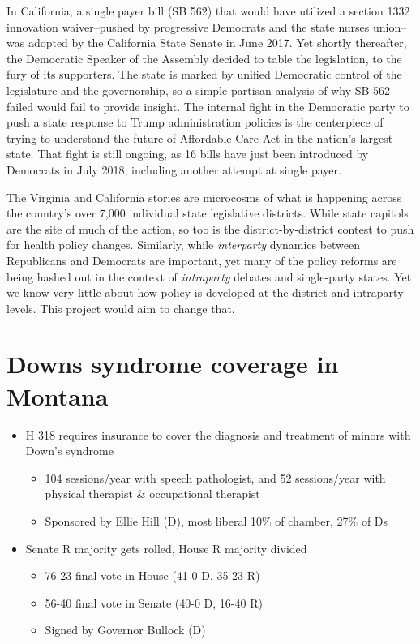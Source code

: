 \documentclass[
  oneside]{book}
\providecommand{\tightlist}{%
  \setlength{\itemsep}{0pt}\setlength{\parskip}{0pt}}
\begin{document}
In California, a single payer bill (SB 562) that would have utilized a section 1332 innovation waiver--pushed by progressive Democrats and the state nurses union--was adopted by the California State Senate in June 2017. Yet shortly thereafter, the Democratic Speaker of the Assembly decided to table the legislation, to the fury of its supporters. The state is marked by unified Democratic control of the legislature and the governorship, so a simple partisan analysis of why SB 562 failed would fail to provide insight. The internal fight in the Democratic party to push a state response to Trump administration policies is the centerpiece of trying to understand the future of Affordable Care Act in the nation's largest state. That fight is still ongoing, as 16 bills have just been introduced by Democrats in July 2018, including another attempt at single payer.

The Virginia and California stories are microcosms of what is happening across the country's over 7,000 individual state legislative districts. While state capitols are the site of much of the action, so too is the district-by-district contest to push for health policy changes. Similarly, while \emph{interparty} dynamics between Republicans and Democrats are important, yet many of the policy reforms are being hashed out in the context of \emph{intraparty} debates and single-party states. Yet we know very little about how policy is developed at the district and intraparty levels. This project would aim to change that.

\hypertarget{downs-syndrome-coverage-in-montana}{%
\section{Downs syndrome coverage in Montana}\label{downs-syndrome-coverage-in-montana}}

\begin{itemize}
\tightlist
\item
  H 318 requires insurance to cover the diagnosis and treatment of minors with Down's syndrome

  \begin{itemize}
  \tightlist
  \item
    104 sessions/year with speech pathologist, and 52 sessions/year with physical therapist \& occupational therapist
  \item
    Sponsored by Ellie Hill (D), most liberal 10\% of chamber, 27\% of Ds
  \end{itemize}
\item
  Senate R majority gets rolled, House R majority divided

  \begin{itemize}
  \tightlist
  \item
    76-23 final vote in House (41-0 D, 35-23 R)
  \item
    56-40 final vote in Senate (40-0 D, 16-40 R)
  \item
    Signed by Governor Bullock (D)
  \end{itemize}
\end{itemize}
\end{document}
